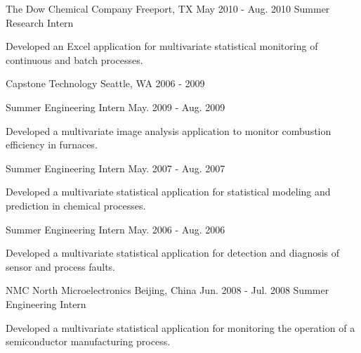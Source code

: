 

\begin{cventries}
\cventry
{The Dow Chemical Company} %
{Freeport, TX} %
{May 2010 - Aug. 2010} %
{Summer Research Intern} %
{
\begin{cvitems} %
\item {Developed an Excel application for multivariate statistical monitoring of continuous and batch processes.}
\end{cvitems}
}
\cvmultientry
{Capstone Technology} %
{Seattle, WA}
{2006 - 2009} %
{
\cvsubentry
{Summer Engineering Intern} %
{} %
{May. 2009 - Aug. 2009} %
{
\begin{cvitems} %
\item {Developed a multivariate image analysis application to monitor combustion efficiency in furnaces.}
\end{cvitems}
}
\cvsubentry
{Summer Engineering Intern} %
{} %
{May. 2007 - Aug. 2007} %
{
\begin{cvitems} %
\item {Developed a multivariate statistical application for statistical modeling and prediction in chemical processes.}
\end{cvitems}
}
\cvsubentry
{Summer Engineering Intern} %
{} %
{May. 2006 - Aug. 2006} %
{
\begin{cvitems} %
\item {Developed a multivariate statistical application for detection and diagnosis of sensor and process faults.}
\end{cvitems}
}
}

\cventry
{NMC North Microelectronics} %
{Beijing, China} %
{Jun. 2008 - Jul. 2008} %
{Summer Engineering Intern} %
{
\begin{cvitems} %
\item {Developed a multivariate statistical application for monitoring the operation of a semiconductor manufacturing process.}
\end{cvitems}
}
\end{cventries}

